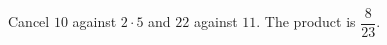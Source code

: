 Cancel $ 10 $ against $ 2\cdot5 $ and $ 22 $ against $ 11 $. The product is $\boxed{\dfrac{8}{23}}$.
